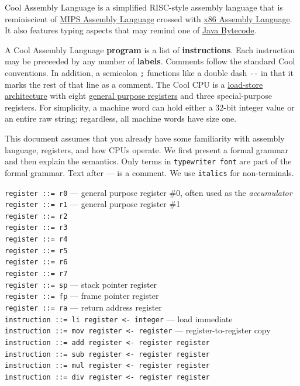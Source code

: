 \documentclass[]{article}
\begin{document}
Cool Assembly Language is a simplified RISC-style assembly language that
is reminiscient of
\href{http://en.wikipedia.org/wiki/MIPS_architecture\#MIPS_assembly_language}{MIPS
Assembly Language} crossed with
\href{http://en.wikipedia.org/wiki/X86_assembly_language}{x86 Assembly
Language}. It also features typing aspects that may remind one of
\href{http://en.wikipedia.org/wiki/Java_bytecode}{Java Bytecode}.

A Cool Assembly Language \textbf{program} is a list of
\textbf{instructions}. Each instruction may be preceeded by any number
of \textbf{labels}. Comments follow the standard Cool conventions. In
addition, a semicolon \texttt{;} functions like a double dash
\texttt{-{}-} in that it marks the rest of that line as a comment. The
Cool CPU is a \href{http://en.wikipedia.org/wiki/RISC}{load-store
architecture} with eight
\href{http://en.wikipedia.org/wiki/General_purpose_register}{general
purpose registers} and three special-purpose registers. For simplicity,
a machine word can hold either a 32-bit integer value or an entire raw
string; regardless, all machine words have size one.

This document assumes that you already have some familiarity with
assembly language, registers, and how CPUs operate. We first present a
formal grammar and then explain the semantics. Only terms in
\texttt{typewriter font} are part of the formal grammar. Text after ---
is a comment. We use \texttt{italics} for non-terminals.

\texttt{register ::= r0} --- general purpose register \#0, often used as
the \emph{accumulator}\\ \texttt{register ::= r1} --- general purpose
register \#1 \\ \texttt{register ::= r2}\\ \texttt{register ::= r3}\\
\texttt{register ::= r4}\\ \texttt{register ::= r5}\\
\texttt{register ::= r6}\\ \texttt{register ::= r7}\\
\texttt{register ::= sp} --- stack pointer register\\
\texttt{register ::= fp} --- frame pointer register\\
\texttt{register ::= ra} --- return address register\\

\texttt{instruction ::= li  register \textless{}- integer} --- load
immediate \\ \texttt{instruction ::= mov register \textless{}- register}
--- register-to-register copy \\
\texttt{instruction ::= add register \textless{}- register register}\\
\texttt{instruction ::= sub register \textless{}- register register}\\
\texttt{instruction ::= mul register \textless{}- register register}\\
\texttt{instruction ::= div register \textless{}- register register}\\
\end{document}
